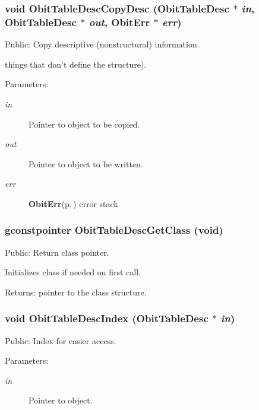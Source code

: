 \subsubsection{\setlength{\rightskip}{0pt plus 5cm}void Obit\-Table\-Desc\-Copy\-Desc ({\bf Obit\-Table\-Desc} $\ast$ {\em in}, {\bf Obit\-Table\-Desc} $\ast$ {\em out}, {\bf Obit\-Err} $\ast$ {\em err})}\label{ObitTableDesc_8h_a11}


Public: Copy descriptive (nonstructural) information. 

things that don't define the structure). \begin{Desc}
\item[Parameters:]
\begin{description}
\item[{\em in}]Pointer to object to be copied. \item[{\em out}]Pointer to object to be written. \item[{\em err}]{\bf Obit\-Err}{\rm (p.\,\pageref{structObitErr})} error stack \end{description}
\end{Desc}
\subsubsection{\setlength{\rightskip}{0pt plus 5cm}gconstpointer Obit\-Table\-Desc\-Get\-Class (void)}\label{ObitTableDesc_8h_a10}


Public: Return class pointer. 

Initializes class if needed on first call. \begin{Desc}
\item[Returns:]pointer to the class structure. \end{Desc}
\subsubsection{\setlength{\rightskip}{0pt plus 5cm}void Obit\-Table\-Desc\-Index ({\bf Obit\-Table\-Desc} $\ast$ {\em in})}\label{ObitTableDesc_8h_a12}


Public: Index for easier access. 

\begin{Desc}
\item[Parameters:]
\begin{description}
\item[{\em in}]Pointer to object. \end{description}
\end{Desc}
